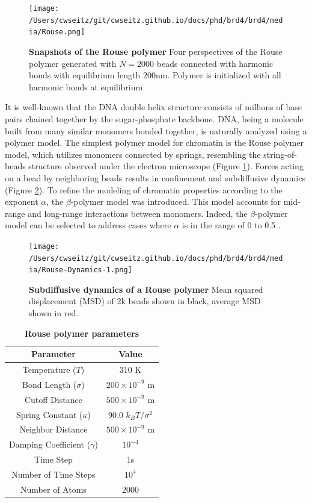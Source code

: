 \begin{figure}[t]
\texttt{[image: /Users/cwseitz/git/cwseitz.github.io/docs/phd/brd4/brd4/media/Rouse.png]}
\caption{\textbf{Snapshots of the Rouse polymer} Four perspectives of the Rouse polymer generated with $N=2000$ beads connected with harmonic bonds with equilibrium length $200\mathrm{nm}$. Polymer is initialized with all harmonic bonds at equilibrium}
\label{fig:fig19}
\end{figure}


It is well-known that the DNA double helix structure consists of millions of base pairs chained together by the sugar-phosphate backbone. DNA, being a molecule built from many similar monomers bonded together, is naturally analyzed using a polymer model. The simplest polymer model for chromatin is the Rouse polymer model, which utilizes monomers connected by springs, resembling the string-of-beads structure observed under the electron microscope (Figure \ref{fig:fig19}). Forces acting on a bead by neighboring beads results in confinement and subdiffusive dynamics (Figure \ref{fig:fig20}). To refine the modeling of chromatin properties according to the exponent $\alpha$, the $\beta$-polymer model was introduced. This model accounts for mid-range and long-range interactions between monomers. Indeed, the $\beta$-polymer model can be selected to address cases where $\alpha$ is in the range of 0 to 0.5 \parencite{Amitai2013,Amitai2017,Hajjoul2013}.


\begin{figure}[t]
\centering
\texttt{[image: /Users/cwseitz/git/cwseitz.github.io/docs/phd/brd4/brd4/media/Rouse-Dynamics-1.png]}
\caption{\textbf{Subdiffusive dynamics of a Rouse polymer} Mean squared displacement (MSD) of 2k beads shown in black, average MSD shown in red.}
\label{fig:fig20}
\end{figure}


\begin{table}[h!]
\centering
\begin{tabular}{|c|c|}
\hline
\textbf{Parameter} & \textbf{Value} \\ \hline
Temperature ($T$) & 310 K \\ \hline
Bond Length ($\sigma$) & $200 \times 10^{-9}$ m \\ \hline
Cutoff Distance & $500 \times 10^{-9}$ m \\ \hline
Spring Constant ($\kappa$) & 90.0 $k_{B}T/\sigma^2$ \\ \hline
Neighbor Distance & $500 \times 10^{-9}$ m \\ \hline
Damping Coefficient ($\gamma$) & $10^{-4}$ \\ \hline
Time Step & 1s\\ \hline
Number of Time Steps & $10^4$ \\ \hline
Number of Atoms & 2000 \\ \hline
\end{tabular}
\caption{\textbf{Rouse polymer parameters}}
\end{table}

